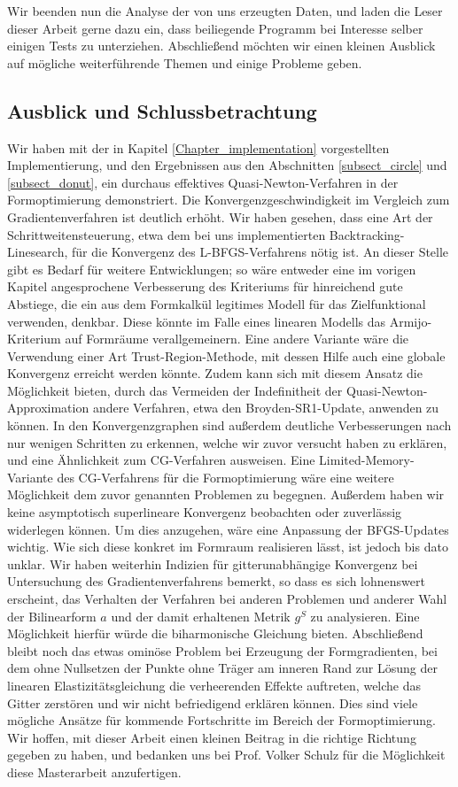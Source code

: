 Wir beenden nun die Analyse der von uns erzeugten Daten, und laden die Leser dieser Arbeit gerne dazu ein, dass beiliegende Programm bei Interesse selber einigen Tests zu unterziehen. Abschließend möchten wir einen kleinen Ausblick auf mögliche weiterführende Themen und einige Probleme geben.

\subsection{Ausblick und Schlussbetrachtung}
Wir haben mit der in Kapitel \ref{Chapter_implementation} vorgestellten Implementierung, und den Ergebnissen aus den Abschnitten \ref{subsect_circle} und \ref{subsect_donut}, ein durchaus effektives Quasi-Newton-Verfahren in der Formoptimierung demonstriert. 
Die Konvergenzgeschwindigkeit im Vergleich zum Gradientenverfahren ist deutlich erhöht. Wir haben gesehen, dass eine Art der Schrittweitensteuerung, etwa dem bei uns implementierten Backtracking-Linesearch, für die Konvergenz des L-BFGS-Verfahrens nötig ist. An dieser Stelle gibt es Bedarf für weitere Entwicklungen; so wäre entweder eine im vorigen Kapitel angesprochene Verbesserung des Kriteriums für hinreichend gute Abstiege, die ein aus dem Formkalkül legitimes Modell für das Zielfunktional verwenden, denkbar. Diese könnte im Falle eines linearen Modells das Armijo-Kriterium auf Formräume verallgemeinern. Eine andere Variante wäre die Verwendung einer Art Trust-Region-Methode, mit dessen Hilfe auch eine globale Konvergenz erreicht werden könnte. Zudem kann sich mit diesem Ansatz die Möglichkeit bieten, durch das Vermeiden der Indefinitheit der Quasi-Newton-Approximation andere Verfahren, etwa den Broyden-SR1-Update, anwenden zu können. In den Konvergenzgraphen sind außerdem deutliche Verbesserungen nach nur wenigen Schritten zu erkennen, welche wir zuvor versucht haben zu erklären, und eine Ähnlichkeit zum CG-Verfahren ausweisen. Eine Limited-Memory-Variante des CG-Verfahrens für die Formoptimierung wäre eine weitere Möglichkeit dem zuvor genannten Problemen zu begegnen. Außerdem haben wir keine asymptotisch superlineare Konvergenz beobachten oder zuverlässig widerlegen können. Um dies anzugehen, wäre eine Anpassung der BFGS-Updates wichtig. Wie sich diese konkret im Formraum realisieren lässt, ist jedoch bis dato unklar. Wir haben weiterhin Indizien für gitterunabhängige Konvergenz bei Untersuchung des Gradientenverfahrens bemerkt, so dass es sich lohnenswert erscheint, das Verhalten der Verfahren bei anderen Problemen und anderer Wahl der Bilinearform $a$ und der damit erhaltenen Metrik $g^S$ zu analysieren. Eine Möglichkeit hierfür würde die biharmonische Gleichung bieten. Abschließend bleibt noch das etwas ominöse Problem bei Erzeugung der Formgradienten, bei dem ohne Nullsetzen der Punkte ohne Träger am inneren Rand zur Lösung der linearen Elastizitätsgleichung die verheerenden Effekte auftreten, welche das Gitter zerstören und wir nicht befriedigend erklären können. Dies sind viele mögliche Ansätze für kommende  Fortschritte im Bereich der Formoptimierung. Wir hoffen, mit dieser Arbeit einen kleinen Beitrag in die richtige Richtung gegeben zu haben, und bedanken uns bei Prof. Volker Schulz für die Möglichkeit diese Masterarbeit anzufertigen.
\newpage
\nocite{*}




